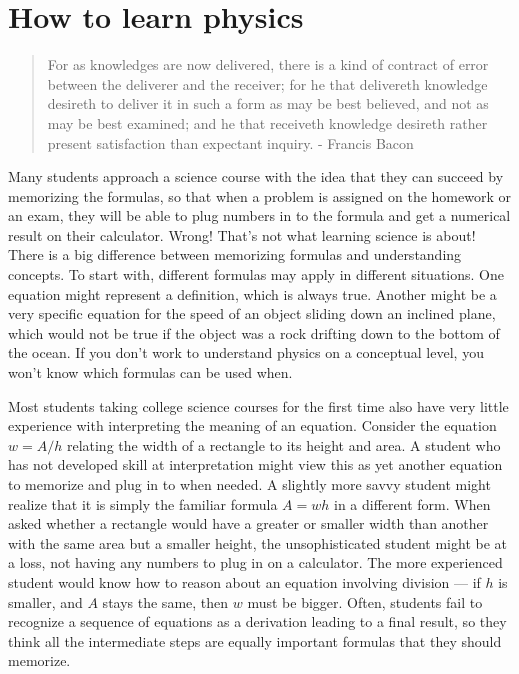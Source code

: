 
\section{How to learn physics}


\begin{quote}
For as knowledges are now delivered, there is a kind of
contract of error between the deliverer and the receiver;
for he that delivereth knowledge desireth to deliver it in
such a form as may be best believed, and not as may be best
examined; and he that receiveth knowledge desireth rather
present satisfaction than expectant inquiry. - Francis Bacon
\end{quote}

Many students approach a science course with the idea that
they can succeed by memorizing the formulas, so that when a
problem is assigned on the homework or an exam, they will be
able to plug numbers in to the formula and get a numerical
result on their calculator. Wrong! That's not what learning
science is about! There is a big difference between
memorizing formulas and understanding concepts. To start
with, different formulas may apply in different situations.
One equation might represent a definition, which is always
true. Another might be a very specific equation for the
speed of an object sliding down an inclined plane, which
would not be true if the object was a rock drifting down to
the bottom of the ocean. If you don't work to understand
physics on a conceptual level, you won't know which
formulas can be used when.

Most students taking college science courses for the first
time also have very little experience with interpreting the
meaning of an equation. Consider the equation $w=A/h$
relating the width of a rectangle to its height and area. A
student who has not developed skill at interpretation might
view this as yet another equation to memorize and plug in to
when needed. A slightly more savvy student might realize
that it is simply the familiar formula $A=wh$ in a
different form. When asked whether a rectangle would have a
greater or smaller width than another with the same area but
a smaller height, the unsophisticated student might be at a
loss, not having any numbers to plug in on a calculator. The
more experienced student would know how to reason about an
equation involving division --- if $h$ is smaller, and $A$
stays the same, then $w$ must be bigger. Often, students
fail to recognize a sequence of equations as a derivation
leading to a final result, so they think all the intermediate
steps are equally important formulas that they should memorize.

